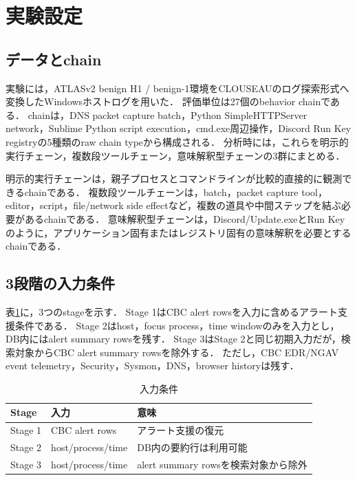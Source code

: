 

\section{実験設定}

\subsection{データとchain}

実験には，ATLASv2 benign H1 / benign-1環境をCLOUSEAUのログ探索形式へ変換したWindowsホストログを用いた．
評価単位は27個のbehavior chainである．
chainは，DNS packet capture batch，Python SimpleHTTPServer network，Sublime Python script execution，cmd.exe周辺操作，Discord Run Key registryの5種類のraw chain typeから構成される．
分析時には，これらを明示的実行チェーン，複数段ツールチェーン，意味解釈型チェーンの3群にまとめる．

明示的実行チェーンは，親子プロセスとコマンドラインが比較的直接的に観測できるchainである．
複数段ツールチェーンは，batch，packet capture tool，editor，script，file/network side effectなど，複数の道具や中間ステップを結ぶ必要があるchainである．
意味解釈型チェーンは，Discord/Update.exeとRun Keyのように，アプリケーション固有またはレジストリ固有の意味解釈を必要とするchainである．

\subsection{3段階の入力条件}

表\ref{table:stages}に，3つのstageを示す．
Stage 1はCBC alert rowsを入力に含めるアラート支援条件である．
Stage 2はhost，focus process，time windowのみを入力とし，DB内にはalert summary rowsを残す．
Stage 3はStage 2と同じ初期入力だが，検索対象からCBC alert summary rowsを除外する．
ただし，CBC EDR/NGAV event telemetry，Security，Sysmon，DNS，browser historyは残す．

\begin{table}[ht]
    \centering
    \caption{入力条件}
    \label{table:stages}
    \begin{tabularx}{\linewidth}{lXX}
        \toprule
        Stage & 入力 & 意味 \\
        \midrule
        Stage 1 & CBC alert rows & アラート支援の復元 \\
        Stage 2 & host/process/time & DB内の要約行は利用可能 \\
        Stage 3 & host/process/time & alert summary rowsを検索対象から除外 \\
        \bottomrule
    \end{tabularx}
\end{table}

